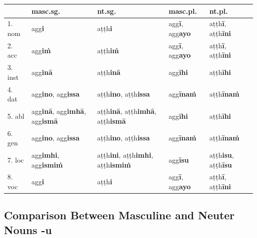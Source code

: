 \documentclass[11pt,oneside]{memoir}
\begin{document}
\begin{center}
\begin{tabular}{lllll}
 & \textbf{masc.sg.} & \textbf{nt.sg.} & \textbf{masc.pl.} & \textbf{nt.pl.}\\[0pt]
\hline
1. nom & agg\textbf{i} & aṭṭh\textbf{i} & agg\textbf{ī}, agg\textbf{ayo} & aṭṭh\textbf{ī}, aṭṭh\textbf{īni}\\[0pt]
2. acc & agg\textbf{iṁ} & aṭṭh\textbf{iṁ} & agg\textbf{ī}, agg\textbf{ayo} & aṭṭh\textbf{ī}, aṭṭh\textbf{īni}\\[0pt]
3. inst & agg\textbf{inā} & aṭṭh\textbf{inā} & agg\textbf{īhi} & aṭṭh\textbf{īhi}\\[0pt]
4. dat & agg\textbf{ino}, agg\textbf{issa} & aṭṭh\textbf{ino}, aṭṭh\textbf{issa} & agg\textbf{īnaṁ} & aṭṭh\textbf{īnaṁ}\\[0pt]
5. abl & agg\textbf{inā}, agg\textbf{imhā}, agg\textbf{ismā} & aṭṭh\textbf{inā}, aṭṭh\textbf{imhā}, aṭṭh\textbf{ismā} & agg\textbf{īhi} & aṭṭh\textbf{īhi}\\[0pt]
6. gen & agg\textbf{ino}, agg\textbf{issa} & aṭṭh\textbf{ino}, aṭṭh\textbf{issa} & agg\textbf{īnaṁ} & aṭṭh\textbf{īnaṁ}\\[0pt]
7. loc & agg\textbf{imhi}, agg\textbf{ismiṁ} & aṭṭh\textbf{ini}, aṭṭh\textbf{imhi}, aṭṭh\textbf{ismiṁ} & agg\textbf{īsu} & aṭṭh\textbf{isu}, aṭṭh\textbf{īsu}\\[0pt]
8. voc & agg\textbf{i} & aṭṭh\textbf{i} & agg\textbf{ī}, agg\textbf{ayo} & aṭṭh\textbf{ī}, aṭṭh\textbf{īni}\\[0pt]
\end{tabular}
\end{center}

\subsection{Comparison Between Masculine and Neuter Nouns -u}
\label{sec:org7211cdf}
\end{document}
